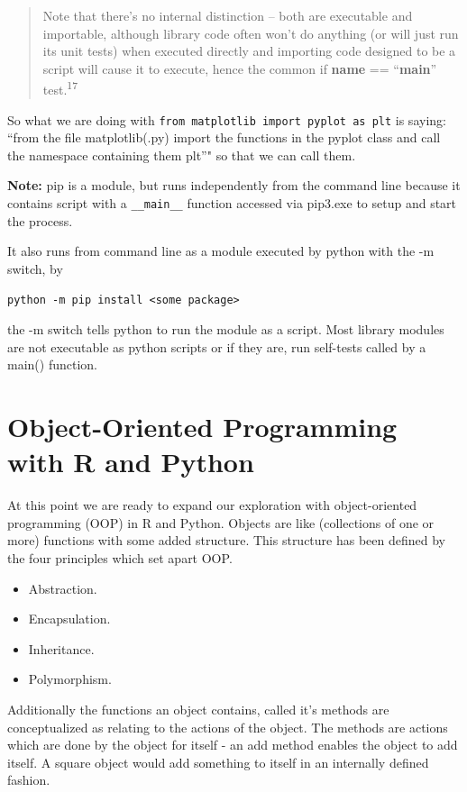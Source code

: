 \documentclass[]{book}
\providecommand{\tightlist}{%
  \setlength{\itemsep}{0pt}\setlength{\parskip}{0pt}}
\theoremstyle{definition}
\theoremstyle{definition}
\theoremstyle{definition}
\theoremstyle{remark}
\begin{document}
\begin{quote}
Note that there's no internal distinction -- both are executable and
importable, although library code often won't do anything (or will just
run its unit tests) when executed directly and importing code designed
to be a script will cause it to execute, hence the common if
\textbf{name} == ``\textbf{main}'' test.\textsuperscript{17}
\end{quote}

So what we are doing with
\texttt{from\ matplotlib\ import\ pyplot\ as\ plt} is saying: ``from the
file matplotlib(.py) import the functions in the pyplot class and call
the namespace containing them plt''" so that we can call them.

\textbf{Note:} pip is a module, but runs independently from the command
line because it contains script with a \texttt{\_\_main\_\_} function
accessed via pip3.exe to setup and start the process.

It also runs from command line as a module executed by python with the
-m switch, by

\begin{verbatim}
python -m pip install <some package>
\end{verbatim}

the -m switch tells python to run the module as a script. Most library
modules are not executable as python scripts or if they are, run
self-tests called by a main() function.

\chapter{Object-Oriented Programming with R and
Python}\label{object-oriented-programming-with-r-and-python}

At this point we are ready to expand our exploration with
object-oriented programming (OOP) in R and Python. Objects are like
(collections of one or more) functions with some added structure. This
structure has been defined by the four principles which set apart OOP.

\begin{itemize}
\tightlist
\item
  Abstraction.
\item
  Encapsulation.
\item
  Inheritance.
\item
  Polymorphism.
\end{itemize}

Additionally the functions an object contains, called it's methods are
conceptualized as relating to the actions of the object. The methods are
actions which are done by the object for itself - an add method enables
the object to add itself. A square object would add something to itself
in an internally defined fashion.
\end{document}
